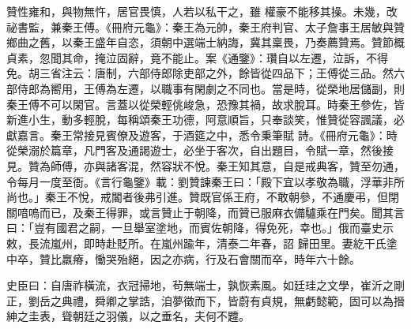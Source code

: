 \begin{pinyinscope}
 贊性雍和，與物無忤，居官畏慎，人若以私干之，雖
 權豪不能移其操。未幾，改祕書監，兼秦王傅。《冊府元龜》：秦王為元帥，秦王府判官、太子詹事王居敏與贊鄉曲之舊，以秦王盛年自恣，須朝中選端士納誨，冀其稟畏，乃奏薦贊焉。贊節概貞素，忽聞其命，掩泣固辭，竟不能止。案《通鑒》：瓚自以左遷，泣訴，不得免。胡三省注云：唐制，六部侍郎除吏部之外，餘皆從四品下；王傅從三品。然六部侍郎為嚮用，王傅為左遷，以職事有閑劇之不同也。當是時，從榮地居儲副，則秦王傅不可以閑官。言蓋以從榮輕佻峻急，恐豫其禍，故求脫耳。時秦王參佐，皆新進小生，動多輕脫，每稱頌秦王功德，阿意順旨，只奉談笑，惟贊從容諷議，必獻嘉言。秦王常接見賓僚及遊客，于酒筵之中，悉令秉筆賦
 詩。《冊府元龜》：時從榮溺於篇章，凡門客及通謁遊士，必坐于客次，自出題目，令賦一章，然後接見。贊為師傅，亦與諸客混，然容狀不悅。秦王知其意，自是戒典客，贊至勿通，令每月一度至衙。《言行龜鑒》載：劉贊諫秦王曰：「殿下宜以孝敬為職，浮華非所尚也。」秦王不悅，戒閽者後弗引進。贊既官係王府，不敢朝參，不通慶弔，但閉關喑嗚而已，及秦王得罪，或言贊止于朝降，而贊已服麻衣備驢乘在門矣。聞其言曰：「豈有國君之嗣，一旦舉室塗地，而賓佐朝降，得免死，幸也。」俄而臺史示敕，長流嵐州，即時赴貶所。在嵐州踰年，清泰二年春，詔
 歸田里。妻紇干氏塗中卒，贊比羸瘠，慟哭殆絕，因之亦病，行及石會關而卒，時年六十餘。



 史臣曰：自唐祚橫流，衣冠掃地，茍無端士，孰恢素風。如廷珪之文學，崔沂之剛正，劉岳之典禮，舜卿之掌誥，洎夢徵而下，皆蔚有貞規，無虧懿範，固可以為搢紳之圭表，聳朝廷之羽儀，以之垂名，夫何不韙。



\end{pinyinscope}